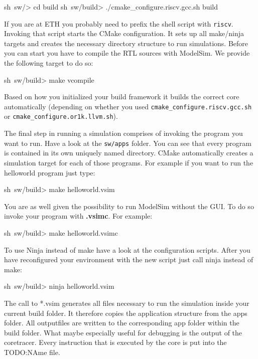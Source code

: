 \begin{shellenv}
sh~sw/> cd build
sh~sw/build> ./cmake_configure.riscv.gcc.sh build
\end{shellenv}

If you are at ETH you probably need to prefix the shell script with \verb+riscv+.
Invoking that script starts the CMake configuration. It sets up all make/ninja targets and creates the necessary directory structure to run simulations. Before you can start you have to compile the RTL sources with ModelSim. We provide the following target to do so: 

\begin{shellenv}
sh~sw/build> make vcompile
\end{shellenv}

Based on how you initialized your build framework it builds the correct core automatically (depending on whether you used \verb+cmake_configure.riscv.gcc.sh+ or \verb+cmake_configure.or1k.llvm.sh+).

The final step in running a simulation comprises of invoking the program you want to run. Have a look at the \verb+sw/apps+ folder. You can see that every program is contained in its own uniquely named directory. CMake automatically creates a simulation target for each of those programs. For example if you want to run the helloworld program just type:

\begin{shellenv}
sh~sw/build> make helloworld.vsim
\end{shellenv}

You are as well given the possibility to run ModelSim without the GUI. To do so invoke your program with \textbf{.vsimc}. For example:

\begin{shellenv}
sh~sw/build> make helloworld.vsimc
\end{shellenv}

To use Ninja instead of make have a look at the configuration scripts. After you have reconfigured your environment with the new script just call ninja instead of make:

\begin{shellenv}
sh~sw/build> ninja helloworld.vsim
\end{shellenv}

The call to *.vsim generates all files necessary to run the simulation inside your current build folder. It therefore copies the application structure from the apps folder. All outputfiles are written to the corresponding app folder within the build folder. What maybe especially useful for debugging is the output of the coretracer. Every instruction that is executed by the core is put into the TODO:NAme file.

